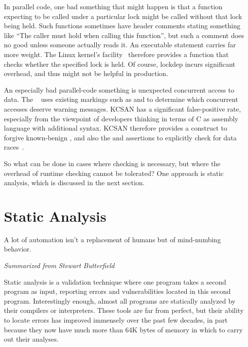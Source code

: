 In parallel code, one bad something that might happen is that
a function expecting to be called under a particular lock might be called
without that lock being held.
Such functions sometimes have header comments stating something like
``The caller must hold  when calling this function'', but
such a comment does no good unless someone actually reads it.
An executable statement carries far more weight.
The Linux kernel's 
facility~\cite{JonathanCorbet2006lockdep,StevenRostedt2011locdepCryptic}
therefore provides a  function that checks
whether the specified lock is held.
Of course, lockdep incurs significant overhead, and thus might not be
helpful in production.

An especially bad parallel-code something is unexpected concurrent
access to data.
The ~\cite{JonathanCorbet2019KCSAN}
uses existing markings such as  and 
to determine which concurrent accesses deserve warning messages.
KCSAN has a significant false-positive rate, especially from the
viewpoint of developers thinking in terms of C as assembly language
with additional syntax.
KCSAN therefore provides a  construct to forgive
known-benign , and also the 
and  assertions to explicitly check for data
races~\cite{MarcoElver2020FearDataRaceDetector1,MarcoElver2020FearDataRaceDetector2}.

So what can be done in cases where checking is necessary, but where the
overhead of runtime checking cannot be tolerated?
One approach is static analysis, which is discussed in the next section.

\section{Static Analysis}
\label{sec:debugging:Static Analysis}
%
\epigraph{A lot of automation isn't a replacement of
	  humans but of mind-numbing behavior.}
	 {\emph{Summarized from Stewart Butterfield}}

Static analysis is a validation technique where one program takes a second
program as input, reporting errors and vulnerabilities located in this
second program.
Interestingly enough, almost all programs are statically analyzed
by their compilers or interpreters.
These tools are far from perfect, but their ability to locate
errors has improved immensely over the past few decades, in part because
they now have much more than 64K bytes of memory in which to carry out their
analyses.

